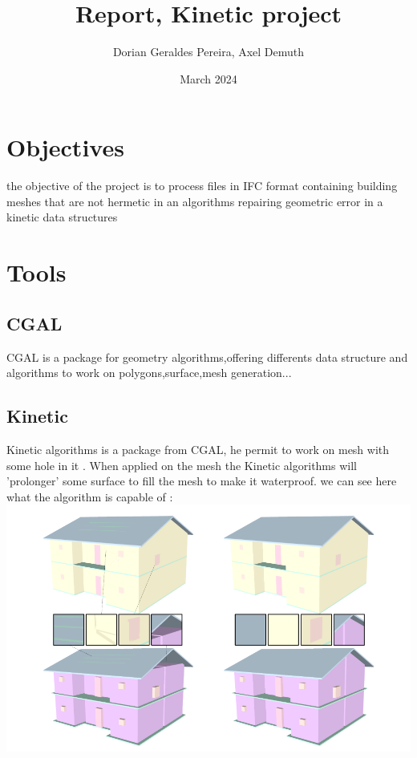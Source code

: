 \documentclass{article}
\title{Report, Kinetic project}
\author{Dorian Geraldes Pereira, Axel Demuth}
\date{March 2024}
\begin{document}
\maketitle
\tableofcontents
\newpage
\section{Objectives}
the objective of the project is to process files in IFC format containing building meshes that are not hermetic in an algorithms repairing
geometric error in a kinetic data structures
\section{Tools}
\subsection{CGAL}
CGAL is a package for geometry algorithms,offering differents data structure and algorithms
to work on polygons,surface,mesh generation... 
\subsection{Kinetic}
Kinetic algorithms is a package from CGAL, he permit to work on mesh with some hole in it .
When applied on the mesh the Kinetic algorithms will 'prolonger' some surface to fill the mesh to make it 
waterproof.
we can see here what the algorithm is capable of :
\includegraphics[scale =   0.3 ]{../../images/example_algorithm.png}
\nocite{*}


\end{document}
